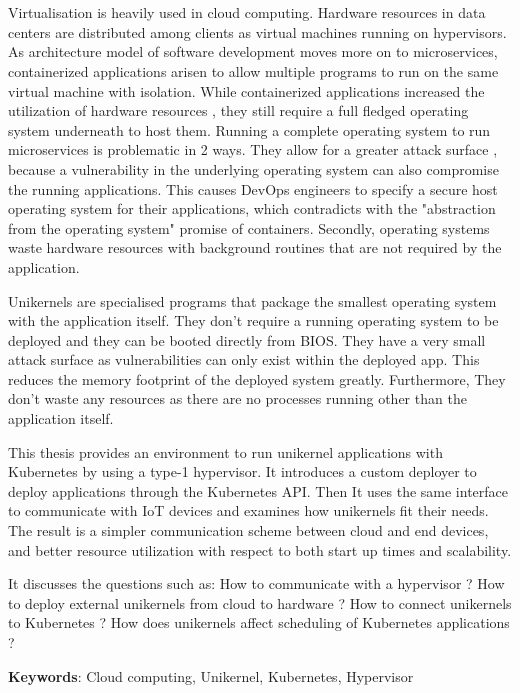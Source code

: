 \chapter{\abstractname}

Virtualisation is heavily used in cloud computing. Hardware resources in data centers are distributed among clients as virtual machines running on hypervisors. As architecture model of software development moves more on to microservices, containerized applications arisen to allow multiple programs to run on the same virtual machine with isolation. While containerized applications increased the utilization of hardware resources , they still require a full fledged operating system underneath to host them.
Running a complete operating system to run microservices is problematic in 2 ways. They allow for a greater attack surface , because a vulnerability in the underlying operating system can also compromise the running applications. This causes DevOps engineers to specify a secure host operating system for their applications, which contradicts with the "abstraction from the operating system" promise of containers. Secondly, operating systems waste hardware resources with background routines that are not required by the application. 

Unikernels are specialised programs that package the smallest operating system with the application itself. They don't require a running operating system to be deployed and they can be booted directly from BIOS. They have a very small attack surface as vulnerabilities can only exist within the deployed app. This reduces the memory footprint of the deployed system greatly. Furthermore, They don't waste any resources as there are no processes running other than the application itself. 

This thesis provides an environment to run unikernel applications with Kubernetes by using a type-1 hypervisor. It introduces a custom deployer to deploy applications through the Kubernetes API. Then It uses the same interface to communicate with IoT devices and examines how unikernels fit their needs. The result is a simpler communication scheme between cloud and end devices, and better resource utilization with respect to both start up times and scalability.

It discusses the questions such as: How to communicate with a hypervisor ? How to deploy external unikernels from cloud to hardware ? How to connect unikernels to Kubernetes ? How does unikernels affect scheduling of Kubernetes applications ?

\textbf{Keywords}: Cloud computing, Unikernel, Kubernetes, Hypervisor

